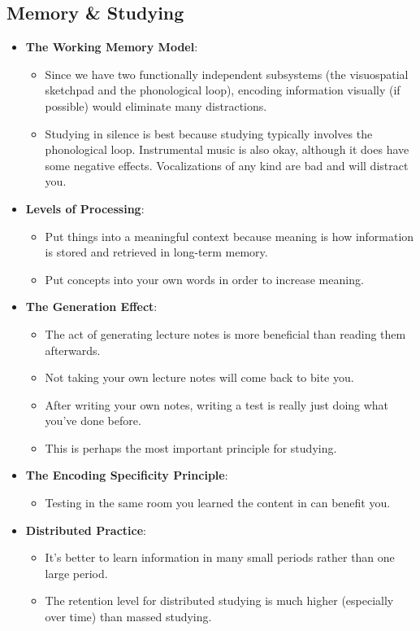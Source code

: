 \documentclass[]{article}
\begin{document}
		\subsection{Memory \& Studying}
			\begin{itemize}
				\item \textbf{The Working Memory Model}:
					\begin{itemize}
						\item Since we have two functionally independent subsystems (the visuospatial sketchpad and the phonological loop), encoding information visually (if possible) would eliminate many distractions.
						\item Studying in silence is best because studying typically involves the phonological loop. Instrumental music is also okay, although it does have some negative effects. Vocalizations of any kind are bad and will distract you.
					\end{itemize}

				\item \textbf{Levels of Processing}:
					\begin{itemize}
						\item Put things into a meaningful context because meaning is how information is stored and retrieved in long-term memory.
						\item Put concepts into your own words in order to increase meaning.
					\end{itemize}

				\item \textbf{The Generation Effect}: 
					\begin{itemize}
						\item The act of generating lecture notes is more beneficial than reading them afterwards.
						\item Not taking your own lecture notes will come back to bite you.
						\item After writing your own notes, writing a test is really just doing what you've done before.
						\item This is perhaps the most important principle for studying.
					\end{itemize}

				\item \textbf{The Encoding Specificity Principle}:
					\begin{itemize}
						\item Testing in the same room you learned the content in can benefit you.
					\end{itemize}

				\item \textbf{Distributed Practice}: 
					\begin{itemize}
						\item It's better to learn information in many small periods rather than one large period.
						\item The retention level for distributed studying is much higher (especially over time) than massed studying.
					\end{itemize}
			\end{itemize}
\end{document}
